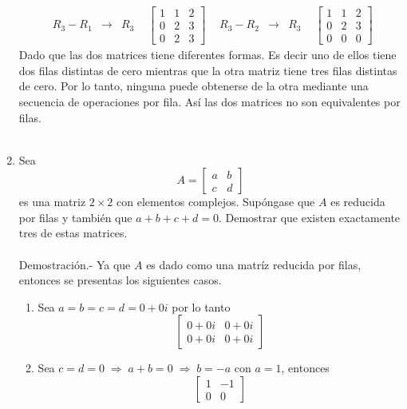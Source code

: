 \begin{enumerate}[\bfseries 1.]
$$\begin{array}{*{5}{c}}
\begin{array}{rcl}
		R_3-R_1&\to& R_3
	    \end{array}
	    &
	    \left[\begin{array}{*{3}{r}}
		1&1&2\\
		0&2&3\\
		0&2&3
	    \end{array}\right]
	    &
	    \begin{array}{rcl}
		R_3-R_2&\to& R_3
	    \end{array}
	    &
	    \left[\begin{array}{*{3}{r}}
		1&1&2\\
		0&2&3\\
		0&0&0
	    \end{array}\right]
	\end{array}
	$$
	Dado que las dos matrices tiene diferentes formas. Es decir uno de ellos tiene dos filas distintas de cero mientras que la otra matriz tiene tres filas distintas de cero. Por lo tanto, ninguna puede obtenerse de la otra mediante una secuencia de operaciones por fila. Así las dos matrices no son equivalentes por filas.\\\\


    \item Sea
    $$A=\left[\begin{array}{rr}
	    a & b  \\
	    c & d  
    \end{array}\right]$$
    es una matriz $2\times 2$ con elementos complejos. Supóngase que $A$ es reducida por filas y también que $a+b+c+d=0$. Demostrar que existen exactamente tres de estas matrices.\\\\
    	Demostración.-\; Ya que $A$ es dado como una matríz reducida por filas, entonces se presentas los siguientes casos.
	\begin{enumerate}
	    \item Sea $a=b=c=d=0+0i$ por lo tanto
		$$\left[\begin{array}{*{2}{r}}
		    0+0i & 0+0i \\
		    0+0i & 0+0i
		\end{array}\right]$$

	    \item Sea $c=d=0\; \Rightarrow \; a+b=0 \; \Rightarrow \; b=-a$ con $a=1$, entonces
		$$\left[\begin{array}{*{2}{r}}
		    1 & -1 \\
		    0 & 0
		\end{array}\right]$$


\end{enumerate}
\end{enumerate}
